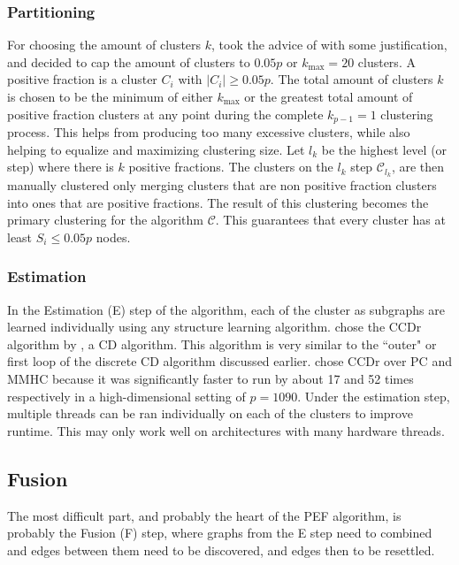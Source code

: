 \documentclass[twoside,11pt]{article}
\let\mc\mathcal
\begin{document}
\subsubsection{Partitioning}
For choosing the amount of clusters $k$, \citeauthor{jiaying} took the advice of \cite{hartigan1981} with some justification, and decided to cap the amount of clusters to $0.05p$ or $k_\text{max}=20$ clusters. A positive fraction is a cluster $C_i$ with $|C_i|\geq 0.05p$. The total amount of clusters $k$ is chosen to be the minimum of either $k_\text{max}$ or the greatest total amount of positive fraction clusters at any point during the complete $k_{p-1}=1$ clustering process. This helps from producing too many excessive clusters, while also helping to equalize and maximizing clustering size. Let $l_k$ be the highest level (or step) where there is $k$ positive fractions. The clusters on the $l_k$ step $\mc{C}_{l_k}$, are then manually clustered only merging clusters that are non positive fraction clusters into ones that are positive fractions. The result of this clustering becomes the primary clustering for the algorithm $\mc{C}$. This guarantees that every cluster has at least $S_i\leq 0.05p$ nodes.

\subsubsection{Estimation}

In the Estimation (E) step of the algorithm, each of the cluster as subgraphs are learned individually using any structure learning algorithm. \cite{jiaying} chose the CCDr algorithm by \citeauthor{aragam2014}, a CD algorithm. This algorithm is very similar to the ``outer" or first loop of the discrete CD algorithm discussed earlier. \citeauthor{jiaying} chose CCDr over PC and MMHC because it was significantly faster to run by about 17 and 52 times respectively in a high-dimensional setting of $p=1090$. Under the estimation step, multiple threads can be ran individually on each of the clusters to improve runtime. This may only work well on architectures with many hardware threads.

\subsection{Fusion}

The most difficult part, and probably the heart of the PEF algorithm, is probably the Fusion (F) step, where graphs from the E step need to combined and edges between them need to be discovered, and edges then to be resettled.
\end{document}
